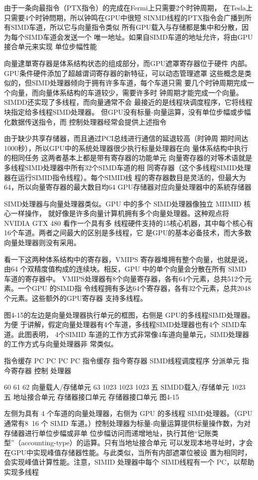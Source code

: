 由于一条向最指令（PTX指令）的完成在Fermi上只需要2个时钟周期，
在Tesla上只需要4个时钟問期，所以钟鸣在GPU中很短
SINMD线程的PTX指令会广播到所有SIMD车道，所以它与向量指令类似
所有GPU载入与存储都是集中和分散，因为每个SIMD车道会发送一个
唯一地址。如果自SIMD车道的地址允许，将由GPU接合单元来实现
单位步幅性能

向量逮單寄存器是体系结构状态的组成部分，而GPU遮罩寄存器位于硬件
内部。GPU条件硬件添加了超越谓词寄存器的新特征，可以动态管理遮罩
这些概念是类似的，但SIMD处理器倾向于拥有许多车道，每个车道只需
要几个时钟周期完成一个向量，而向量体系结构的车道较少，需要许多时
钟周期才能完成一个向量。SIMDD还实现了多线程，而向量通常不会
最接近的是线程块调度程序，它将线程块指定给多线程SIMD处理器。
但GPU没有标量-向量运算，没有单位步幅或步幅化数据传送指令，而
控制处理器经常会提供上述指令

由于缺少共享存储器，而且通过PCI总线进行通信的延退较高（时钟周
期时间达1000秒），所以GPU中的系统处理器很少执行标量处理器在向
量体系结构中执行的相同任务
这两者基本上都是带有寄存器的功能单元
向量寄存器的对等术语就是多线程SIMD处理器中所有32个SIMD车道的相
同寄存器（这个多线程SIMID处理器在运行SIMID指令线程）。每个SIMID线
程的寄存器数目是灵活的，但最大为64，所以向量寄存器的最大数目均64
GPU存储器对应向量处理器中的系統存储器

SIMD处理器与向量处理器类似。GPU 中的多个 SIMD处理器像独立 MIIMID 核心一样操作，
就好像是许多向量计算机拥有多个向量处理器。这种观点将 NVIDIA GTX 480 看作一个具有多
线程硬件支持的15核心机器，其中每个核心有16个车道。两者之间最大的区别是多线程，它
是GPU的基本必备技术，而大多数向量处理器则没有采用。

看一下这两种体系结构中的寄存器，VMIPS 寄存器堆拥有整个向量，也就是说，由64
个双精度值构成的连续块。相反，GPU 中的单个向量会分散在所有 SIMD 车道的寄存器中。
VMIPS处理器有8个向量寄存器，各有64个元素，总共512个元素。一个GPU 的SIMD指
令线程拥有多达64个寄存器，各有32个元素，总共2048个元素。这些额外的GPU寄存器
支持多线程。

图4-15的左边是向量处理器执行单元的框图，右侧是 GPU的多线程SIMD处理器。为便
于讲解，假定向量处理器有4个车道，多线程SIMD处理器也有4个 SIMD车道。此图表明，
4个SIMID 车道的工作方式非常像4车道向量单元，SIMD处理器的工作方式与向量处理器非
常类似。

指令缓存
PC
PC
PC
PC
指令缓存
指今寄存器
SIMD线程调度程序
分派单元
指今寄存器
控制
处理器

60
61
62
向量载人/存储单元
63
1023
1023
1023
五
SIMDD载入/存储单元
1023
五
地址接合单元
存储器接口单元
存储器接口单元
图4-15

左侧为具有 4 个车道的向量处理器，右侧为 GPU 的多线程 SIMD处理器。（GPU通常有8~16
个 SIMD 车道。）控制处理器为标量-向量运算提供标量操作数，为对存储器进行单位步幅或非单
位步幅访问而递增地址，执行其他“记账类型”（accounting-type）的运算。只有当地址接合单元
可以发现本地寻址时，才会在GPU中实现峰值存储器性能。与此类似，当所有内部遮罩位被设
置为相同时，会实现峰值计算性能。注意，SIMID 处理器中每个 SIMD线程有一个 PC，以帮助
实现多线程

